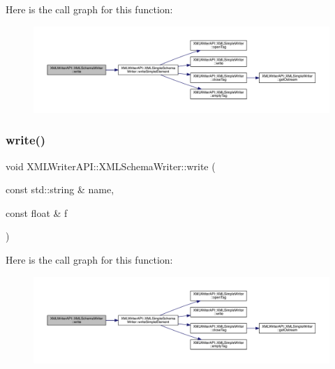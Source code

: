 Here is the call graph for this function\+:
\nopagebreak
\begin{figure}[H]
\begin{center}
\leavevmode
\includegraphics[width=350pt]{db/d34/classXMLWriterAPI_1_1XMLSchemaWriter_a1b951af62e2106b76e33022c0f1b5d88_cgraph}
\end{center}
\end{figure}
\mbox{\label{classXMLWriterAPI_1_1XMLSchemaWriter_affbcfbac63240a8048b6b0940cc05c30}} 
\subsubsection{\texorpdfstring{write()}{write()}\hspace{0.1cm}{\footnotesize\ttfamily [7/15]}}
{\footnotesize\ttfamily void X\+M\+L\+Writer\+A\+P\+I\+::\+X\+M\+L\+Schema\+Writer\+::write (\begin{DoxyParamCaption}\item[{const std\+::string \&}]{name,  }\item[{const float \&}]{f }\end{DoxyParamCaption})\hspace{0.3cm}{\ttfamily [inline]}}

Here is the call graph for this function\+:
\nopagebreak
\begin{figure}[H]
\begin{center}
\leavevmode
\includegraphics[width=350pt]{db/d34/classXMLWriterAPI_1_1XMLSchemaWriter_affbcfbac63240a8048b6b0940cc05c30_cgraph}
\end{center}
\end{figure}
\mbox{\label{classXMLWriterAPI_1_1XMLSchemaWriter_affbcfbac63240a8048b6b0940cc05c30}} 
